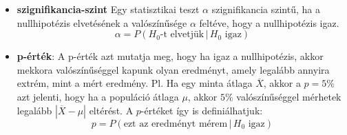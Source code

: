 \documentclass[12pt]{article}
\theoremstyle{plain}
\begin{document}
\begin{itemize}
\begin{equation*}
    \end{equation*}
    \item \textbf{szignifikancia-szint} Egy statisztikai teszt $\alpha$ szignifikancia szintű, ha 
    a nullhipotézis elvetésének a valószínűsége $\alpha$ feltéve, hogy a nullhipotézis igaz.
    \begin{equation*}
        \alpha = P(\text{$H_0$-t elvetjük}\,|\,\text{$H_0$ igaz})
    \end{equation*}
    \item \textbf{p-érték}: A p-érték azt mutatja meg, hogy ha igaz a nullhipotézis, akkor mekkora 
    valószínűséggel kapunk olyan eredményt, amely legalább annyira extrém, mint a mért eredmény.
    Pl. Ha egy minta átlaga $\overline{X}$, akkor a $p=5\%$ azt jelenti, hogy ha a populáció átlaga $\mu$,
    akkor $5\%$ valószínűséggel mérhetek legalább $|\overline{X}-\mu|$ eltérést. A $p$-értéket így is definiálhatjuk:
    \begin{equation*}
        p = P(\text{ezt az eredményt mérem}\,|\,\text{$H_0$ igaz})
    \end{equation*}
    
\end{itemize}
\end{document}
